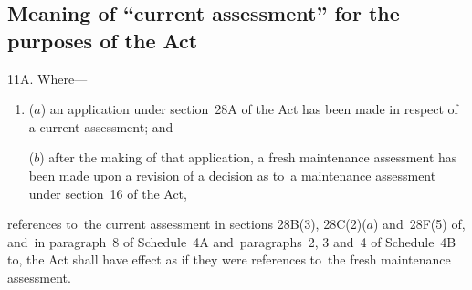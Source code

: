 \documentclass[12pt,a4paper]{article}
\begin{document}
\subsection[11A. Meaning of “current assessment” for the purposes of the Act]{Meaning of “current assessment” for the purposes of the Act}

%
%
%
%
%

11A.  Where---
\begin{enumerate}\item[]
($a$) an application under section~28A of the Act has been made in respect of a current assessment; and

($b$) after the making of that application, a fresh maintenance assessment has been made upon a revision of a decision as to~a maintenance assessment under section~16 of the Act,
\end{enumerate}
references to~the current assessment in sections 28B(3), 28C(2)($a$) and~28F(5) of, and~in paragraph~8 of Schedule~4A and~paragraphs~2, 3 and~4 of Schedule~4B to, the Act shall have effect as if they were references to~the fresh maintenance assessment.
\end{document}
